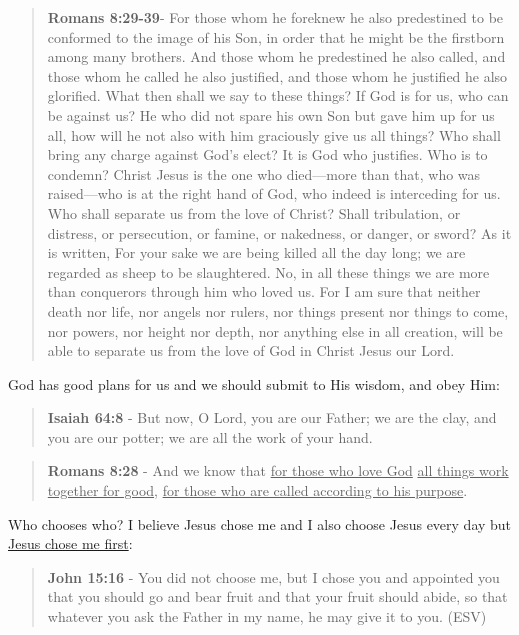 \documentclass[11pt]{article}
\begin{document}
\begin{quote}
\textbf{Romans 8:29-39}- For those whom he foreknew he also predestined to be conformed to the image of his Son, in order that he might be the firstborn among many brothers. And those whom he predestined he also called, and those whom he called he also justified, and those whom he justified he also glorified. What then shall we say to these things? If God is for us, who can be against us? He who did not spare his own Son but gave him up for us all, how will he not also with him graciously give us all things? Who shall bring any charge against God's elect? It is God who justifies. Who is to condemn? Christ Jesus is the one who died—more than that, who was raised—who is at the right hand of God, who indeed is interceding for us. Who shall separate us from the love of Christ? Shall tribulation, or distress, or persecution, or famine, or nakedness, or danger, or sword? As it is written, For your sake we are being killed all the day long; we are regarded as sheep to be slaughtered. No, in all these things we are more than conquerors through him who loved us. For I am sure that neither death nor life, nor angels nor rulers, nor things present nor things to come, nor powers, nor height nor depth, nor anything else in all creation, will be able to separate us from the love of God in Christ Jesus our Lord.
\end{quote}

God has good plans for us and we should submit to His wisdom, and obey Him:

\begin{quote}
\textbf{Isaiah 64:8} - But now, O Lord, you are our Father; we are the clay, and you are our potter; we are all the work of your hand.
\end{quote}

\begin{quote}
\textbf{Romans 8:28} - And we know that \uline{for those who love God} \uline{all things work together for good}, \uline{for those who are called according to his purpose}.
\end{quote}

Who chooses who? I believe Jesus chose me and I also choose Jesus every day but \uline{Jesus chose me first}:

\begin{quote}
\textbf{John 15:16} - You did not choose me, but I chose you and appointed you that you should go and bear fruit and that your fruit should abide, so that whatever you ask the Father in my name, he may give it to you. (ESV)
\end{quote}
\end{document}
